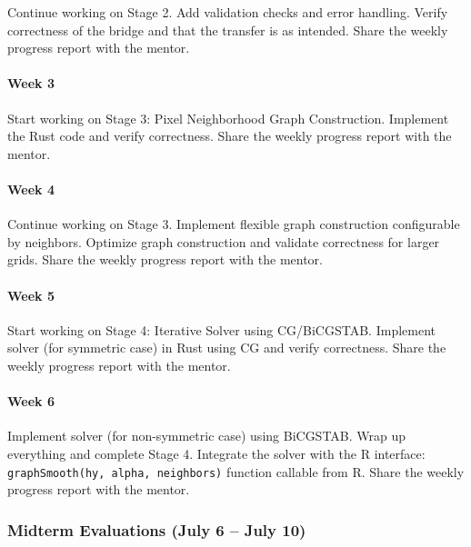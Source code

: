 \documentclass[11pt]{article}
\begin{document}
\hfill\break
Continue working on Stage 2. Add validation checks and error handling.
Verify correctness of the bridge and that the transfer is as intended.
Share the weekly progress report with the mentor.

\hypertarget{week-3-2}{%
\paragraph{Week 3}\label{week-3-2}}

\hfill\break
Start working on Stage 3: Pixel Neighborhood Graph Construction.
Implement the Rust code and verify correctness. Share the weekly
progress report with the mentor.

\hypertarget{week-4-2}{%
\paragraph{Week 4}\label{week-4-2}}

\hfill\break
Continue working on Stage 3. Implement flexible graph construction
configurable by neighbors. Optimize graph construction and validate
correctness for larger grids. Share the weekly progress report with the
mentor.

\hypertarget{week-5}{%
\paragraph{Week 5}\label{week-5}}

\hfill\break
Start working on Stage 4: Iterative Solver using CG/BiCGSTAB. Implement
solver (for symmetric case) in Rust using CG and verify correctness.
Share the weekly progress report with the mentor.

\hypertarget{week-6}{%
\paragraph{Week 6}\label{week-6}}

\hfill\break
Implement solver (for non-symmetric case) using BiCGSTAB. Wrap up
everything and complete Stage 4. Integrate the solver with the R
interface: \texttt{graphSmooth(hy,\ alpha,\ neighbors)} function
callable from R. Share the weekly progress report with the mentor.

\hypertarget{midterm-evaluations-july-6-july-10}{%
\subsubsection{Midterm Evaluations (July 6 -- July
10)}\label{midterm-evaluations-july-6-july-10}}
\end{document}
